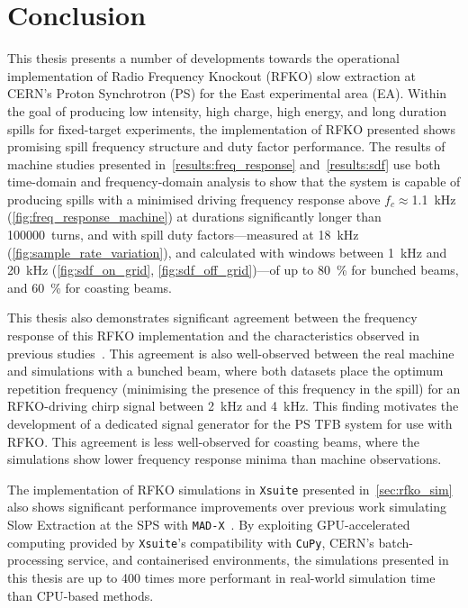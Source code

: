 \documentclass[a4paper,twoside,11pt]{report}
\begin{document}
\chapter{Conclusion}\label{chap:conclusion}

This thesis presents a number of developments towards the operational implementation of Radio Frequency Knockout (RFKO) slow extraction at CERN's Proton Synchrotron (PS) for the East experimental area (EA). Within the goal of producing low intensity, high charge, high energy, and long duration spills for fixed-target experiments, the implementation of RFKO presented shows promising spill frequency structure and duty factor performance. The results of machine studies presented in~\autoref{results:freq_response} and~\autoref{results:sdf} use both time-domain and frequency-domain analysis to show that the system is capable of producing spills with a minimised driving frequency response above $f_c\approx$\qty{1.1}{\kilo\hertz} (\autoref{fig:freq_response_machine}) at durations significantly longer than \qty{100000}{turns}, and with spill duty factors---measured at \qty{18}{\kilo\hertz} (\autoref{fig:sample_rate_variation}), and calculated with windows between \qty{1}{\kilo\hertz} and \qty{20}{\kilo\hertz} (\autoref{fig:sdf_on_grid}, \autoref{fig:sdf_off_grid})---of up to \qty{80}{\percent} for bunched beams, and \qty{60}{\percent} for coasting beams.

This thesis also demonstrates significant agreement between the frequency response of this RFKO implementation and the characteristics observed in previous studies~\cite{wepmp008,Pari:2780495}. This agreement is also well-observed between the real machine and simulations with a bunched beam, where both datasets place the optimum repetition frequency (minimising the presence of this frequency in the spill) for an RFKO-driving chirp signal between \qty{2}{\kilo\hertz} and \qty{4}{\kilo\hertz}. This finding motivates the development of a dedicated signal generator for the PS TFB system for use with RFKO. 
This agreement is less well-observed for coasting beams, where the simulations show lower frequency response minima than machine observations. 

The implementation of RFKO simulations in \verb|Xsuite| presented in~\autoref{sec:rfko_sim} also shows significant performance improvements over previous work simulating Slow Extraction at the SPS with \verb|MAD-X|~\cite{Schicho:2039579}. By exploiting GPU-accelerated computing provided by \verb|Xsuite|'s compatibility with \verb|CuPy|, CERN's batch-processing service, and containerised environments, the simulations presented in this thesis are up to 400 times more performant in real-world simulation time than CPU-based methods.
\end{document}
